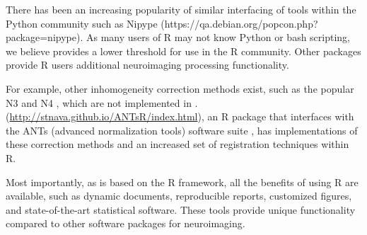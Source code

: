 \documentclass[a4paper]{report}\usepackage[]{graphicx}\usepackage[]{color}
\let\pkg=\strong
\begin{document}
\begin{article}
There has been an increasing popularity of similar interfacing of tools within the Python community such as Nipype \citep{gorgolewski_nipype:_2011} (https://qa.debian.org/popcon.php?package=nipype).  As many users of R may not know Python or bash scripting, we believe \pkg{fslr} provides a lower threshold for use in the R community.  Other packages provide R users additional neuroimaging processing functionality.   

For example, other inhomogeneity correction methods exist, such as the popular N3 \citep{sled_nonparametric_1998} and N4 \citep{tustison_n4itk:_2010}, which are not implemented in \pkg{fslr}. \pkg{ANTsR} (\url{http://stnava.github.io/ANTsR/index.html}), an R package that interfaces with the ANTs (advanced normalization tools) software suite \citep{avants_reproducible_2011}, has implementations of these correction methods and an increased set of registration techniques within R.


Most importantly, as \pkg{fslr} is based on the R framework, all the benefits of using R are available, such as dynamic documents, reproducible reports, customized figures, and state-of-the-art statistical software.  These tools provide unique functionality compared to other software packages for neuroimaging.  


%








\end{article}
\end{document}
